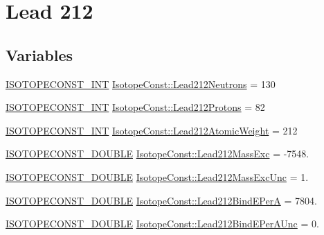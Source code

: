\hypertarget{group___isotope_const-_lead-_pb212}{}\section{Lead 212}
\label{group___isotope_const-_lead-_pb212}
\subsection*{Variables}
\begin{DoxyCompactItemize}
\item 
\mbox{\hyperlink{group___isotope_const-_macros_ga5f18360b3e99483a35c32d789e62621c}{I\+S\+O\+T\+O\+P\+E\+C\+O\+N\+S\+T\+\_\+\+I\+NT}} \mbox{\hyperlink{group___isotope_const-_lead-_pb212_gaad8c8302b5b573a47429bced4d73a99f}{Isotope\+Const\+::\+Lead212\+Neutrons}} = 130
\item 
\mbox{\hyperlink{group___isotope_const-_macros_ga5f18360b3e99483a35c32d789e62621c}{I\+S\+O\+T\+O\+P\+E\+C\+O\+N\+S\+T\+\_\+\+I\+NT}} \mbox{\hyperlink{group___isotope_const-_lead-_pb212_gacfbb824f3bf2ef674cd7ae95b87a9434}{Isotope\+Const\+::\+Lead212\+Protons}} = 82
\item 
\mbox{\hyperlink{group___isotope_const-_macros_ga5f18360b3e99483a35c32d789e62621c}{I\+S\+O\+T\+O\+P\+E\+C\+O\+N\+S\+T\+\_\+\+I\+NT}} \mbox{\hyperlink{group___isotope_const-_lead-_pb212_ga1ced68e764cba2c25310988322a06e8a}{Isotope\+Const\+::\+Lead212\+Atomic\+Weight}} = 212
\item 
\mbox{\hyperlink{group___isotope_const-_macros_ga8f45a7272ce02c0b4c65c44636ed719a}{I\+S\+O\+T\+O\+P\+E\+C\+O\+N\+S\+T\+\_\+\+D\+O\+U\+B\+LE}} \mbox{\hyperlink{group___isotope_const-_lead-_pb212_gac052ec679bf9dd14263b23f4e71e1cca}{Isotope\+Const\+::\+Lead212\+Mass\+Exc}} = -\/7548.
\item 
\mbox{\hyperlink{group___isotope_const-_macros_ga8f45a7272ce02c0b4c65c44636ed719a}{I\+S\+O\+T\+O\+P\+E\+C\+O\+N\+S\+T\+\_\+\+D\+O\+U\+B\+LE}} \mbox{\hyperlink{group___isotope_const-_lead-_pb212_gabca317bb46cf6ca1081244484823f704}{Isotope\+Const\+::\+Lead212\+Mass\+Exc\+Unc}} = 1.
\item 
\mbox{\hyperlink{group___isotope_const-_macros_ga8f45a7272ce02c0b4c65c44636ed719a}{I\+S\+O\+T\+O\+P\+E\+C\+O\+N\+S\+T\+\_\+\+D\+O\+U\+B\+LE}} \mbox{\hyperlink{group___isotope_const-_lead-_pb212_ga62d15472468962e87fe3be3dd9eeecce}{Isotope\+Const\+::\+Lead212\+Bind\+E\+PerA}} = 7804.
\item 
\mbox{\hyperlink{group___isotope_const-_macros_ga8f45a7272ce02c0b4c65c44636ed719a}{I\+S\+O\+T\+O\+P\+E\+C\+O\+N\+S\+T\+\_\+\+D\+O\+U\+B\+LE}} \mbox{\hyperlink{group___isotope_const-_lead-_pb212_gaed90e5c4a7868e51c53838ae23802ab3}{Isotope\+Const\+::\+Lead212\+Bind\+E\+Per\+A\+Unc}} = 0.

\end{DoxyCompactItemize}
